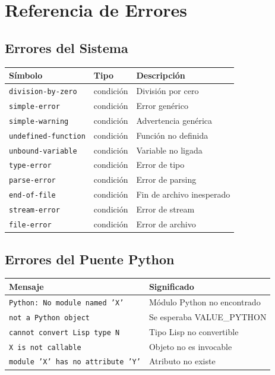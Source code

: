 \chapter{Referencia de Errores}
\label{app:errors}

\section*{Errores del Sistema}

\begin{center}
\begin{tabular}{lll}
\toprule
\textbf{Símbolo} & \textbf{Tipo} & \textbf{Descripción} \\
\midrule
\texttt{division-by-zero} & condición & División por cero \\
\texttt{simple-error} & condición & Error genérico \\
\texttt{simple-warning} & condición & Advertencia genérica \\
\texttt{undefined-function} & condición & Función no definida \\
\texttt{unbound-variable} & condición & Variable no ligada \\
\texttt{type-error} & condición & Error de tipo \\
\texttt{parse-error} & condición & Error de parsing \\
\texttt{end-of-file} & condición & Fin de archivo inesperado \\
\texttt{stream-error} & condición & Error de stream \\
\texttt{file-error} & condición & Error de archivo \\
\bottomrule
\end{tabular}
\end{center}

\section*{Errores del Puente Python}

\begin{center}
\begin{tabular}{ll}
\toprule
\textbf{Mensaje} & \textbf{Significado} \\
\midrule
\texttt{Python: No module named 'X'} & Módulo Python no encontrado \\
\texttt{not a Python object} & Se esperaba VALUE\_PYTHON \\
\texttt{cannot convert Lisp type N} & Tipo Lisp no convertible \\
\texttt{X is not callable} & Objeto no es invocable \\
\texttt{module 'X' has no attribute 'Y'} & Atributo no existe \\
\bottomrule
\end{tabular}
\end{center}

